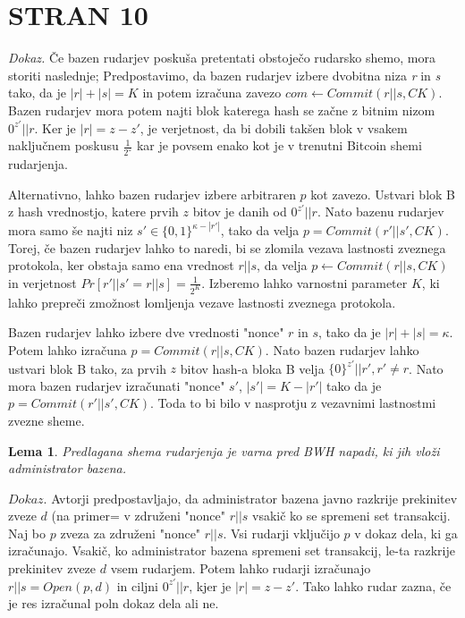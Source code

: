 \documentclass[12pt]{article}
\newtheorem{lema}{Lema}
\begin{document}
\section{STRAN 10}

\noindent \textit{Dokaz.} Če bazen rudarjev poskuša pretentati obstoječo rudarsko shemo, mora storiti naslednje; Predpostavimo, da bazen rudarjev izbere dvobitna niza \textit{r} in \textit{s} tako, da je \textit{$|r| + |s| = K$} in potem izračuna zavezo \textit{$com \leftarrow Commit(r||s, CK)$}. Bazen rudarjev mora potem najti blok katerega hash se začne z bitnim nizom \textit{$0^{z'}||r$}. Ker je \textit{$|r| = z - z'$}, je verjetnost, da bi dobili takšen blok v vsakem naključnem poskusu $\frac{1}{2^{z}}$ kar je povsem enako kot je v trenutni Bitcoin shemi rudarjenja. 

Alternativno, lahko bazen rudarjev izbere arbitraren \textit{$p$} kot zavezo. Ustvari blok B z hash vrednostjo, katere prvih \textit{$z$} bitov je danih od \textit{$0^{z'}||r$}. Nato bazenu rudarjev mora samo še najti niz  \textit{$s' \in \{0, 1\}^{\kappa-|r'|}$}, tako da velja \textit{$p = Commit(r'||s',CK)$}. Torej, če bazen rudarjev lahko to naredi, bi se zlomila vezava lastnosti zveznega protokola, ker obstaja samo ena vrednost \textit{$r||s$}, da velja \textit{$p \leftarrow Commit(r||s, CK)$} in verjetnost \textit{$Pr [r'||s' = r||s] = \frac{1}{2^{K}}$}. Izberemo lahko varnostni parameter \textit{$K$}, ki lahko prepreči zmožnost lomljenja vezave lastnosti zveznega protokola.

Bazen rudarjev lahko izbere dve vrednosti "nonce" \textit{$r$} in \textit{$s$}, tako da je \textit{$|r| + |s| = \kappa$}. Potem lahko izračuna \textit{$p = Commit(r||s,CK)$}. Nato bazen rudarjev lahko ustvari blok B tako, za  prvih \textit{$z$} bitov hash-a bloka B velja \textit{$\{0\}^{z'}||r',r' \neq r$}. Nato mora bazen rudarjev izračunati "nonce" \textit{$s'$}, \textit{$|s'| = K - |r'|$} tako da je \textit{$p = Commit(r'||s',CK)$}. Toda to bi bilo v nasprotju z vezavnimi lastnostmi zvezne sheme.

\begin{lema}\label{lema4}
	Predlagana shema rudarjenja je varna pred BWH napadi, ki jih vloži administrator bazena.
\end{lema}

\noindent\textit{$Dokaz$}. Avtorji predpostavljajo, da administrator bazena javno razkrije prekinitev zveze \textit{$d$} (na primer= v združeni "nonce" \textit{$r||s$} vsakič ko se spremeni set transakcij. Naj bo \textit{$p$} zveza za združeni "nonce" \textit{$r||s$}. Vsi rudarji vključijo \textit{$p$} v dokaz dela, ki ga izračunajo. Vsakič, ko administrator bazena spremeni set transakcij, le-ta razkrije prekinitev zveze \textit{$d$} vsem rudarjem. Potem lahko rudarji izračunajo \textit{$r||s = Open(p,d)$} in ciljni \textit{$0^{z'}||r$}, kjer je \textit{$|r| = z -z'$}. Tako lahko rudar zazna, če je res izračunal poln dokaz dela ali ne.
\end{document}
